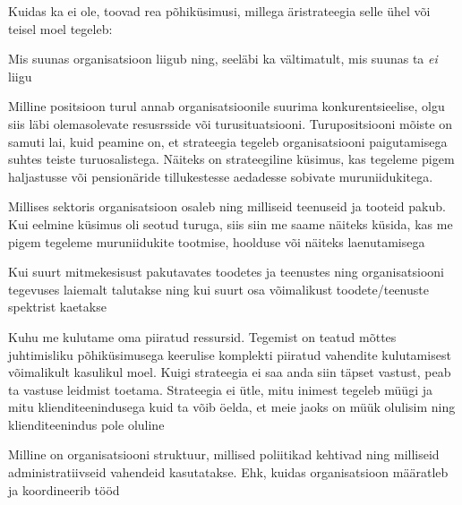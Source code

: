 \documentclass{tufte-book}
\begin{document}
Kuidas ka ei ole, \citeauthor{de2006strategy, rumelt1991strategic} toovad rea põhiküsimusi\cite{rumelt1991strategic}, millega äristrateegia selle ühel või teisel moel tegeleb:
\begin{description}
	\item[Eesmärgid] Mis suunas organisatsioon liigub ning, seeläbi ka vältimatult, mis suunas ta \emph{ei} liigu
	\item[Positsioon] Milline positsioon turul annab organisatsioonile suurima konkurentsieelise, olgu siis läbi olemasolevate resusrsside või turusituatsiooni. Turupositsiooni mõiste on samuti lai, kuid peamine on, et strateegia tegeleb organisatsiooni paigutamisega suhtes teiste turuosalistega. Näiteks on strateegiline küsimus, kas tegeleme pigem haljastusse või pensionäride tillukestesse aedadesse sobivate muruniidukitega.
	\item[Pakutavad tooted ja teenused] Millises sektoris organisatsioon osaleb ning milliseid teenuseid ja tooteid pakub. Kui eelmine küsimus oli seotud turuga, siis siin me saame näiteks küsida, kas me pigem tegeleme muruniidukite tootmise, hoolduse või näiteks laenutamisega
	\item[Tegevusulatus ja mitmekesisus] Kui suurt mitmekesisust pakutavates toodetes ja teenustes ning organisatsiooni tegevuses laiemalt talutakse ning kui suurt osa võimalikust toodete/teenuste spektrist kaetakse
	\item[Ressursside suunamine] Kuhu me kulutame oma piiratud ressursid. Tegemist on teatud mõttes juhtimisliku põhiküsimusega keerulise komplekti piiratud vahendite kulutamisest võimalikult kasulikul moel. Kuigi strateegia ei saa anda siin täpset vastust, peab ta vastuse leidmist toetama. Strateegia ei ütle, mitu inimest tegeleb müügi ja mitu klienditeenindusega kuid ta võib öelda, et meie jaoks on müük olulisim ning klienditeenindus pole oluline
	\item[Organisatsiooni disain] Milline on organisatsiooni struktuur, millised poliitikad kehtivad ning milliseid administratiivseid vahendeid kasutatakse. Ehk, kuidas organisatsioon määratleb ja koordineerib tööd
\end{description}
\end{document}
